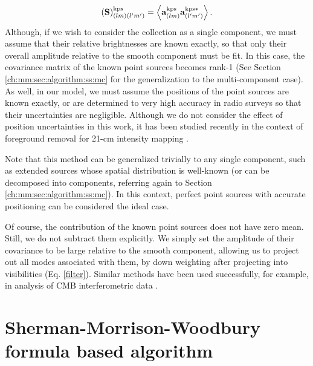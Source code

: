 \begin{equation}
\mathbf{(S)}^{\rm kps}_{(lm)(l'm')} = \left\langle \mathbf{a}^{\rm kps}_{(lm)}\mathbf{a}^{{\rm kps}*}_{(l'm')}\right\rangle.
\label{kpscov}
\end{equation}
Although, if we wish to consider the collection as a single component, we must assume that their relative brightnesses are known exactly, so that only their overall amplitude relative to the smooth component must be fit. In this case, the covariance matrix of the known point sources becomes rank-1 (See Section \ref{ch:mm:sec:algorithm:ss:mc} for the generalization to the multi-component case). As well, in our model, we must assume the positions of the point sources are known exactly, or are determined to very high accuracy in radio surveys so that their uncertainties are negligible. Although we do not consider the effect of position uncertainties in this work, it has been studied recently in the context of foreground removal for 21-cm intensity mapping \citep{barry2016, ewall-wice2016}. 

Note that this method can be generalized trivially to any single component, such as extended sources whose spatial distribution is well-known (or can be decomposed into components, referring again to Section \ref{ch:mm:sec:algorithm:ss:mc}). In this context, perfect point sources with accurate positioning can be considered the ideal case. 

Of course, the contribution of the known point sources does not have zero mean. Still, we do not subtract them explicitly. We simply set the amplitude of their covariance to be large relative to the smooth component, allowing us to project out all modes associated with them, by down weighting after projecting into visibilities (Eq. \eqref{filter}). Similar methods have been used successfully, for example, in analysis of CMB interferometric data \citep{myerscbi}.

\section{Sherman-Morrison-Woodbury formula based algorithm}
\label{ch:mm:sec:algorithm}

